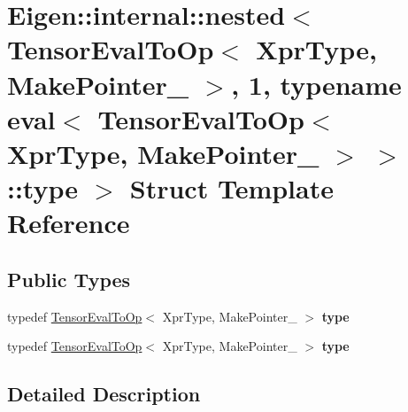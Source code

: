 \hypertarget{struct_eigen_1_1internal_1_1nested_3_01_tensor_eval_to_op_3_01_xpr_type_00_01_make_pointer___01_98b103532d565d0e57efbce4aca129cf}{}\section{Eigen\+:\+:internal\+:\+:nested$<$ Tensor\+Eval\+To\+Op$<$ Xpr\+Type, Make\+Pointer\+\_\+ $>$, 1, typename eval$<$ Tensor\+Eval\+To\+Op$<$ Xpr\+Type, Make\+Pointer\+\_\+ $>$ $>$\+:\+:type $>$ Struct Template Reference}
\label{struct_eigen_1_1internal_1_1nested_3_01_tensor_eval_to_op_3_01_xpr_type_00_01_make_pointer___01_98b103532d565d0e57efbce4aca129cf}
\subsection*{Public Types}
\begin{DoxyCompactItemize}
\item 
\mbox{\label{struct_eigen_1_1internal_1_1nested_3_01_tensor_eval_to_op_3_01_xpr_type_00_01_make_pointer___01_98b103532d565d0e57efbce4aca129cf_a13264b38f27ce92574879c8c390c4648}} 
typedef \hyperlink{class_eigen_1_1_tensor_eval_to_op}{Tensor\+Eval\+To\+Op}$<$ Xpr\+Type, Make\+Pointer\+\_\+ $>$ {\bfseries type}
\item 
\mbox{\label{struct_eigen_1_1internal_1_1nested_3_01_tensor_eval_to_op_3_01_xpr_type_00_01_make_pointer___01_98b103532d565d0e57efbce4aca129cf_a13264b38f27ce92574879c8c390c4648}} 
typedef \hyperlink{class_eigen_1_1_tensor_eval_to_op}{Tensor\+Eval\+To\+Op}$<$ Xpr\+Type, Make\+Pointer\+\_\+ $>$ {\bfseries type}
\end{DoxyCompactItemize}


\subsection{Detailed Description}
